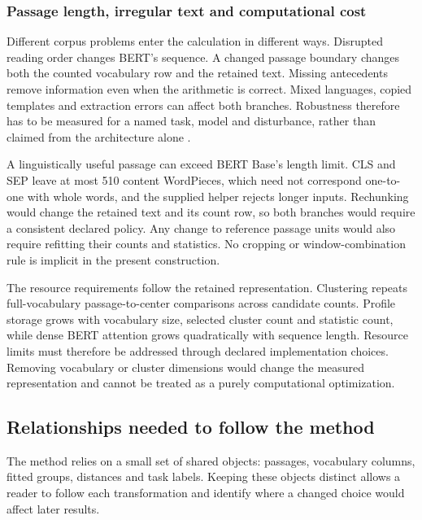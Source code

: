 \documentclass[10pt,letterpaper]{article}
\begin{document}
\subsubsection{Passage length, irregular text and computational cost}
Different corpus problems enter the calculation in different ways. Disrupted reading order changes BERT's sequence. A changed passage boundary changes both the counted vocabulary row and the retained text. Missing antecedents remove information even when the arithmetic is correct. Mixed languages, copied templates and extraction errors can affect both branches. Robustness therefore has to be measured for a named task, model and disturbance, rather than claimed from the architecture alone \cite{robustchatgpt}.\par

A linguistically useful passage can exceed BERT Base's length limit. CLS and SEP leave at most 510 content WordPieces, which need not correspond one-to-one with whole words, and the supplied helper rejects longer inputs. Rechunking would change the retained text and its count row, so both branches would require a consistent declared policy. Any change to reference passage units would also require refitting their counts and statistics. No cropping or window-combination rule is implicit in the present construction.\par

The resource requirements follow the retained representation. Clustering repeats full-vocabulary passage-to-center comparisons across candidate counts. Profile storage grows with vocabulary size, selected cluster count and statistic count, while dense BERT attention grows quadratically with sequence length. Resource limits must therefore be addressed through declared implementation choices. Removing vocabulary or cluster dimensions would change the measured representation and cannot be treated as a purely computational optimization.\par

\subsection{Relationships needed to follow the method}
The method relies on a small set of shared objects: passages, vocabulary columns, fitted groups, distances and task labels. Keeping these objects distinct allows a reader to follow each transformation and identify where a changed choice would affect later results.\par
\end{document}
